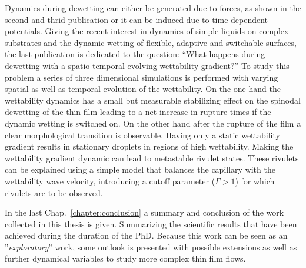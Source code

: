 Dynamics during dewetting can either be generated due to forces, as shown in the second and thrid publication or it can be induced due to time dependent potentials. 
Giving the recent interest in dynamics of simple liquids on complex substrates and the dynamic wetting of flexible, adaptive and switchable surfaces, the last publication is dedicated to the question: ``What happens during dewetting with a spatio-temporal evolving wettability gradient?''
To study this problem a series of three dimensional simulations is performed with varying spatial as well as temporal evolution of the wettability.
On the one hand the wettability dynamics has a small but measurable stabilizing effect on the spinodal dewetting of the thin film leading to a net increase in rupture times if the dynamic wetting is switched on.
On the other hand after the rupture of the film a clear morphological transition is observable.
Having only a static wettability gradient results in stationary droplets in regions of high wettability.
Making the wettability gradient dynamic can lead to metastable rivulet states.
These rivulets can be explained using a simple model that balances the capillary with the wettability wave velocity, introducing a cutoff parameter ($\Gamma > 1$) for which rivulets are to be observed.

In the last Chap.~\ref{chapter:conclusion} a summary and conclusion of the work collected in this thesis is given.
Summarizing the scientific results that have been achieved during the duration of the PhD.
Because this work can be seen as an ''\textit{exploratory}'' work, some outlook is presented with possible extensions as well as further dynamical variables to study more complex thin film flows. 